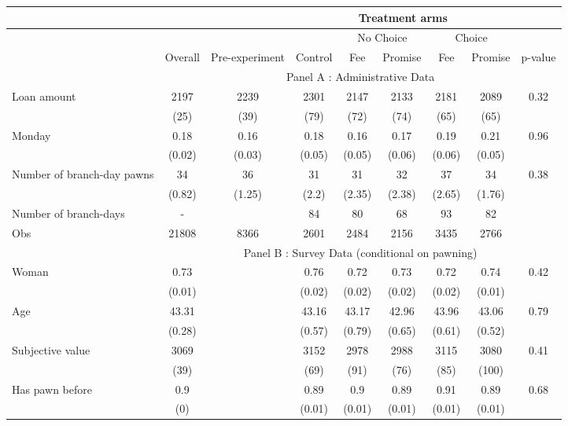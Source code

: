 \begin{tabular}{lcccccccc}
\toprule
      &       &       & \multicolumn{5}{c}{Treatment arms}    &  \\
\midrule
      &       &       &       & \multicolumn{2}{c}{No Choice } & \multicolumn{2}{c}{Choice} &  \\
\midrule
\midrule
      & Overall & Pre-experiment & Control & Fee   & Promise & Fee   & Promise & p-value \\
\midrule
      & \multicolumn{8}{c}{Panel A : Administrative Data} \\
\midrule
\midrule
Loan amount  & 2197  & 2239  & 2301  & 2147  & 2133  & 2181  & 2089  & 0.32 \\
      & (25)  & (39)  & (79)  & (72)  & (74)  & (65)  & (65)  &  \\
Monday & 0.18  & 0.16  & 0.18  & 0.16  & 0.17  & 0.19  & 0.21  & 0.96 \\
      & (0.02) & (0.03) & (0.05) & (0.05) & (0.06) & (0.06) & (0.05) &  \\
Number of branch-day pawns & 34    & 36    & 31    & 31    & 32    & 37    & 34    & 0.38 \\
      & (0.82) & (1.25) & (2.2) & (2.35) & (2.38) & (2.65) & (1.76) &  \\
\midrule
Number of branch-days & -     &       & 84    & 80    & 68    & 93    & 82    &  \\
Obs   & 21808 & 8366  & 2601  & 2484  & 2156  & 3435  & 2766  &  \\
\midrule
      & \multicolumn{8}{c}{Panel B : Survey Data (conditional on pawning)} \\
\midrule
\midrule
Woman & 0.73  &       & 0.76  & 0.72  & 0.73  & 0.72  & 0.74  & 0.42 \\
      & (0.01) &       & (0.02) & (0.02) & (0.02) & (0.02) & (0.01) &  \\
Age   & 43.31 &       & 43.16 & 43.17 & 42.96 & 43.96 & 43.06 & 0.79 \\
      & (0.28) &       & (0.57) & (0.79) & (0.65) & (0.61) & (0.52) &  \\
Subjective value & 3069  &       & 3152  & 2978  & 2988  & 3115  & 3080  & 0.41 \\
      & (39)  &       & (69)  & (91)  & (76)  & (85)  & (100) &  \\
Has pawn before & 0.9   &       & 0.89  & 0.9   & 0.89  & 0.91  & 0.89  & 0.68 \\
      & (0)   &       & (0.01) & (0.01) & (0.01) & (0.01) & (0.01) &  \\

\end{tabular}
